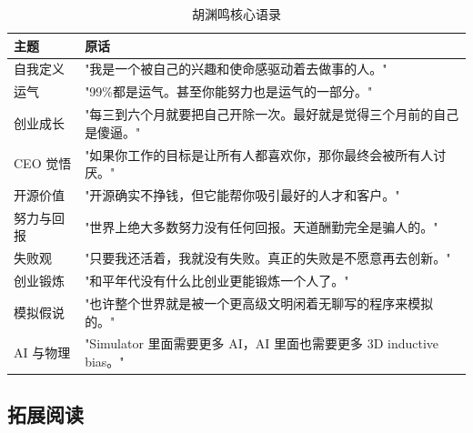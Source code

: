 \documentclass[a4paper]{article}
\begin{document}
\begin{table}[H]
\centering
\caption{胡渊鸣核心语录}
\begin{tabular}{p{3.5cm}p{10cm}}
\toprule
\textbf{主题} & \textbf{原话} \\
\midrule
自我定义 & "我是一个被自己的兴趣和使命感驱动着去做事的人。" \\
\midrule
运气 & "99\%都是运气。甚至你能努力也是运气的一部分。" \\
\midrule
创业成长 & "每三到六个月就要把自己开除一次。最好就是觉得三个月前的自己是傻逼。" \\
\midrule
CEO 觉悟 & "如果你工作的目标是让所有人都喜欢你，那你最终会被所有人讨厌。" \\
\midrule
开源价值 & "开源确实不挣钱，但它能帮你吸引最好的人才和客户。" \\
\midrule
努力与回报 & "世界上绝大多数努力没有任何回报。天道酬勤完全是骗人的。" \\
\midrule
失败观 & "只要我还活着，我就没有失败。真正的失败是不愿意再去创新。" \\
\midrule
创业锻炼 & "和平年代没有什么比创业更能锻炼一个人了。" \\
\midrule
模拟假说 & "也许整个世界就是被一个更高级文明闲着无聊写的程序来模拟的。" \\
\midrule
AI 与物理 & "Simulator 里面需要更多 AI，AI 里面也需要更多 3D inductive bias。" \\
\bottomrule
\end{tabular}
\end{table}

\subsection{拓展阅读}
\end{document}
